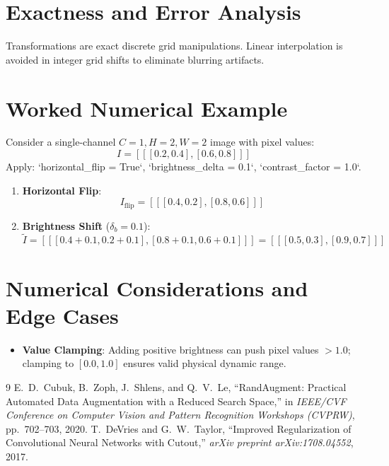 \documentclass[11pt,a4paper]{article}
\theoremstyle{definition}
\begin{document}
\section{Exactness and Error Analysis}

Transformations are exact discrete grid manipulations. Linear interpolation is avoided in integer grid shifts to eliminate blurring artifacts.

\section{Worked Numerical Example}

Consider a single-channel $C = 1, H = 2, W = 2$ image with pixel values:
\begin{equation}
I = [[[0.2, 0.4], [0.6, 0.8]]]
\end{equation}
Apply: `horizontal_flip = True`, `brightness_delta = 0.1`, `contrast_factor = 1.0`.

\begin{enumerate}
    \item \textbf{Horizontal Flip}:
    \begin{equation}
    I_{\text{flip}} = [[[0.4, 0.2], [0.8, 0.6]]]
    \end{equation}
    \item \textbf{Brightness Shift} ($\delta_b = 0.1$):
    \begin{equation}
    \tilde{I} = [[[0.4+0.1, 0.2+0.1], [0.8+0.1, 0.6+0.1]]] = [[[0.5, 0.3], [0.9, 0.7]]]
    \end{equation}
\end{enumerate}

\section{Numerical Considerations and Edge Cases}

\begin{itemize}
    \item \textbf{Value Clamping}: Adding positive brightness can push pixel values $> 1.0$; clamping to $[0.0, 1.0]$ ensures valid physical dynamic range.
\end{itemize}

\begin{thebibliography}{9}
 E.~D.~Cubuk, B.~Zoph, J.~Shlens, and Q.~V.~Le, ``RandAugment: Practical Automated Data Augmentation with a Reduced Search Space,'' in \emph{IEEE/CVF Conference on Computer Vision and Pattern Recognition Workshops (CVPRW)}, pp.~702--703, 2020.
 T.~DeVries and G.~W.~Taylor, ``Improved Regularization of Convolutional Neural Networks with Cutout,'' \emph{arXiv preprint arXiv:1708.04552}, 2017.
\end{thebibliography}
\end{document}
